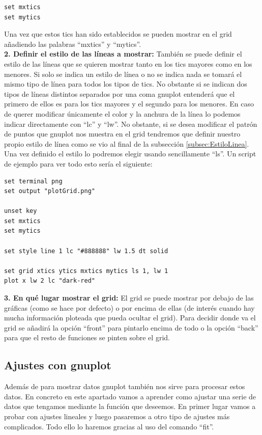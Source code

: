 \documentclass[11pt,a4paper,twoside,pdf]{article}
\numberwithin{equation}{section}
\begin{document}
\begin{lstlisting}[language=Gnuplot]
set mxtics
set mytics
\end{lstlisting}

Una vez que estos tics han sido establecidos se pueden mostrar en el grid añadiendo las palabras ``mxtics'' y ``mytics''. \\

\textbf{2. Definir el estilo de las líneas a mostrar:} También se puede definir el estilo de las líneas que se quieren mostrar tanto en los tics mayores como en los menores. Si solo se indica un estilo de línea o no se indica nada se tomará el mismo tipo de línea para todos los tipos de tics. No obstante si se indican dos tipos de líneas distintos separados por una coma gnuplot entenderá que el primero de ellos es para los tics mayores y el segundo para los menores. En caso de querer modificar únicamente el color y la anchura de la línea lo podemos indicar directamente con ``lc'' y ``lw''. No obstante, si se desea modificar el patrón de puntos que gnuplot nos muestra en el grid tendremos que definir nuestro propio estilo de línea como se vio al final de la subsección \ref{subsec:EstiloLinea}. Una vez definido el estilo lo podremos elegir usando sencillamente ``ls''. Un script de ejemplo para ver todo esto sería el siguiente:

\begin{lstlisting}[language=Gnuplot]
set terminal png
set output "plotGrid.png"

unset key
set mxtics
set mytics

set style line 1 lc "#888888" lw 1.5 dt solid

set grid xtics ytics mxtics mytics ls 1, lw 1
plot x lw 2 lc "dark-red"
\end{lstlisting}

\textbf{3. En qué lugar mostrar el grid:} El grid se puede mostrar por debajo de las gráficas (como se hace por defecto) o por encima de ellas (de interés cuando hay mucha información ploteada que pueda ocultar el grid). Para decidir donde va el grid se añadirá la opción ``front'' para pintarlo encima de todo o la opción ``back'' para que el resto de funciones se pinten sobre el grid.

\subsection{Ajustes con gnuplot}

Además de para mostrar datos gnuplot también nos sirve para procesar estos datos. En concreto en este apartado vamos a aprender como ajustar una serie de datos que tengamos mediante la función que deseemos. En primer lugar vamos a probar con ajustes lineales y luego pasaremos a otro tipo de ajustes más complicados. Todo ello lo haremos gracias al uso del comando ``fit''.
\end{document}
